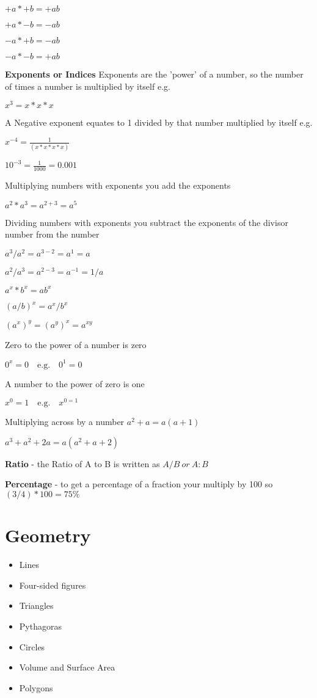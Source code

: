 \documentclass{article}
\begin{document}
$+a * +b = +ab$

$+a * -b = -ab$

$-a * +b = -ab$

$-a * -b = +ab$

\textbf{Exponents or Indices}
Exponents are the 'power' of a number, so the number of times a number is multiplied by itself e.g.

$x^{3} = x * x * x$

A Negative exponent equates to 1 divided by that number multiplied by itself e.g.

$x^{-4} = \frac{1}{(x * x * x * x)}$

$ 10^{-3}  = \frac{1}{1000} = 0.001 $


Multiplying numbers with exponents you add the exponents 

$a^{2} * a^{3} = a^{2+3} = a^{5}$

Dividing numbers with exponents you subtract the exponents of the divisor number from the number 

$a^{3} / a^{2} = a^{3-2} = a^{1} = a$

$a^{2} / a^{3} = a^{2-3} = a^{-1} = 1/a$

$ a^{x} * b^{x} = ab^{x}$

$ (a/b)^{x} = a^{x} / b^{x} $

$ (a^{x})^{y} =  (a^{y})^{x}  = a^{xy}$


Zero to the power of a number is zero

$ 0^{x} = 0 \quad \textrm{e.g.} \quad  0^{1} = 0$

A number to the power of zero is one

$ x^{0} = 1 \quad \textrm{e.g.} \quad  x^{0 =1}$

Multiplying across by a number 
$a^{2} + a = a (a + 1) $

$a^{3} + a^{2} + 2a = a (a^{2} + a  + 2 )$


\textbf{Ratio} - the Ratio of A to B is written as $ A/B \ or \ A : B$


\textbf{Percentage} - to get a percentage of a fraction your multiply by 100 so $ ( 3/4 ) * 100 = 75\%$

\newpage
\section{Geometry}

\begin{itemize}
\item Lines
\item Four-sided figures
\item Triangles
\item Pythagoras
\item Circles
\item Volume and Surface Area
\item Polygons
\end{itemize}
\end{document}

